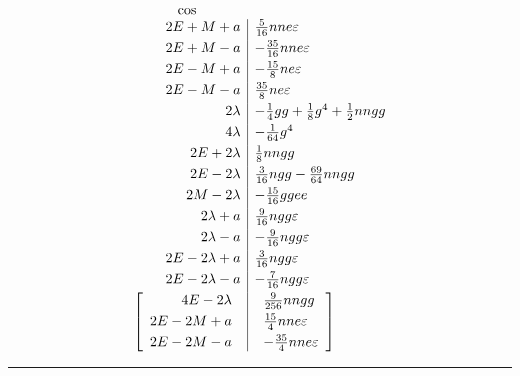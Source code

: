 \[
\begin{array}{r|l}
\multicolumn{1}{c}{\cos}&\\
2E+M+a&\tfrac{5}{16}nne\varepsilon\\[3pt]
2E+M-a&-\tfrac{35}{16}nne\varepsilon\\[3pt]
2E-M+a&-\tfrac{15}{8}ne\varepsilon\\[3pt]
2E-M-a&\tfrac{35}{8}ne\varepsilon\\[3pt]
2\lambda&-\tfrac14gg+\tfrac18g^4+\tfrac12nngg\\[3pt]
4\lambda&-\tfrac{1}{64}g^4\\[3pt]
2E+2\lambda&\tfrac18nngg\\[3pt]
2E-2\lambda&\tfrac{3}{16}ngg-\tfrac{69}{64}nngg\\[3pt]
2M-2\lambda&-\tfrac{15}{16}ggee\\[3pt]
2\lambda+a&\tfrac{9}{16}ngg\varepsilon\\[3pt]
2\lambda-a&-\tfrac{9}{16}ngg\varepsilon\\[3pt]
2E-2\lambda+a&\tfrac{3}{16}ngg\varepsilon\\[3pt]
2E-2\lambda-a&-\tfrac{7}{16}ngg\varepsilon\\[3pt]
\left[\begin{array}{r}
4E-2\lambda\\[3pt]
2E-2M+a\\[3pt]
2E-2M-a
\end{array}\right.&
\left.\begin{array}{l}
\tfrac{9}{256}nngg\\[3pt]
\tfrac{15}{4}nne\varepsilon\\[3pt]
-\tfrac{35}{4}nne\varepsilon
\end{array}\right]
\end{array}
\]
\begin{center}\rule{4cm}{0.4pt}\end{center}

\clearpage
\endgroup
